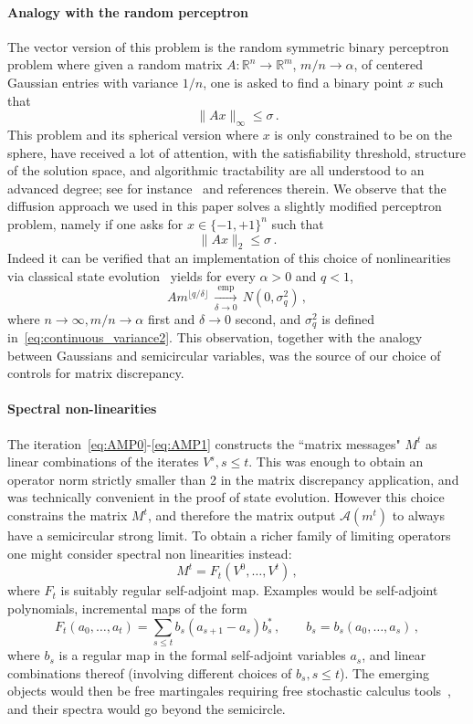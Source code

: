 \documentclass[11pt]{article}
\theoremstyle{definition}
\theoremstyle{remark}
\numberwithin{equation}{section}
\numberwithin{theorem}{section}
\newcommand{\R}{\mathbb R}
\newcommand{\cA}{\mathcal A}
\begin{document}
\paragraph{Analogy with the random perceptron} The vector version of this problem is the random symmetric binary perceptron problem where given a random matrix $A:\R^n \to \R^m$, $m/n \to \alpha$, of centered Gaussian entries with variance $1/n$, one is asked to find a binary point $x$ such that   
 \[\|Ax\|_{\infty} \le \sigma\,.\]
This problem and its spherical version where $x$ is only constrained to be on the sphere, have received a lot of attention, with the satisfiability threshold, structure of the solution space, and algorithmic tractability are all understood to an advanced degree; see for instance~\cite{aubin2019storage,gamarnik2022algorithms,montanari2021tractability,huang2026algorithmic} and references therein. We observe that the diffusion approach we used in this paper solves a slightly modified perceptron problem, namely if one asks for $x \in \{-1,+1\}^n$ such that 
\[\|Ax\|_2\le \sigma\,.\]           
Indeed it can be verified that an implementation of this choice of nonlinearities via classical state evolution~\cite{javanmard2013state} yields for every $\alpha>0$ and $q<1$,
\[Am^{\lfloor q/\delta\rfloor} \,\xrightarrow[\delta \to 0]{\mathrm{emp}}\,N(0,\sigma_q^2)\,,\]   
where $n \to \infty, m/n \to \alpha$ first and $\delta \to 0$ second, and  $\sigma_q^2$ is defined in~\eqref{eq:continuous_variance2}. This observation, together with the analogy between Gaussians and semicircular variables, was the source of our choice of controls for matrix discrepancy.    

\paragraph{Spectral non-linearities} The iteration~\eqref{eq:AMP0}-\eqref{eq:AMP1} constructs the ``matrix messages" $M^t$ as linear combinations of the iterates $V^s, s\le t$. This was enough to obtain an operator norm strictly smaller than 2 in the matrix discrepancy application, and was technically convenient in the proof of state evolution. However this choice constrains the matrix $M^t$, and therefore the matrix output $\cA(m^t)$ to always have a semicircular strong limit. To obtain a richer family of limiting operators one might consider spectral non linearities instead:       
\[M^t =F_t(V^0,\ldots,V^t)\,,\]
where $F_t$ is suitably regular self-adjoint map. Examples would be self-adjoint polynomials, incremental maps of the form 
\[F_t(a_0,\ldots,a_t) = \sum_{s \le t} b_s(a_{s+1}-a_s)b_s^*\,,\qquad b_s = b_s(a_0,\ldots,a_s)\,,\]
where $b_s$ is a regular map in the formal self-adjoint variables $a_s$, and linear combinations thereof (involving different choices of $b_s, s\le t$). The emerging objects  would then be free martingales requiring free stochastic calculus tools~\cite{biane1998stochastic}, and their spectra would go beyond the semicircle. 
\end{document}
